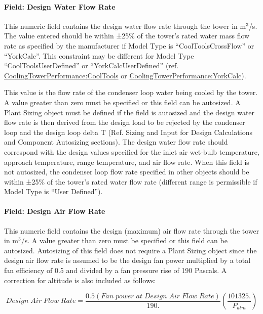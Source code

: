 \paragraph{Field: Design Water Flow Rate}\label{field-design-water-flow-rate-3}

This numeric field contains the design water flow rate through the tower in m\(^{3}\)/s. The value entered should be within ±25\% of the tower's rated water mass flow rate as specified by the manufacturer if Model Type is ``CoolToolsCrossFlow'' or ``YorkCalc''. This constraint may be different for Model Type ``CoolToolsUserDefined'' or ``YorkCalcUserDefined'' (ref. \hyperref[coolingtowerperformancecooltools]{CoolingTowerPerformance:CoolTools} or \hyperref[coolingtowerperformanceyorkcalc]{CoolingTowerPerformance:YorkCalc}).

This value is the flow rate of the condenser loop water being cooled by the tower. A value greater than zero must be specified or this field can be autosized. A Plant Sizing object must be defined if the field is autosized and the design water flow rate is then derived from the design load to be rejected by the condenser loop and the design loop delta T (Ref. Sizing and Input for Design Calculations and Component Autosizing sections). The design water flow rate should correspond with the design values specified for the inlet air wet-bulb temperature, approach temperature, range temperature, and air flow rate. When this field is not autosized, the condenser loop flow rate specified in other objects should be within ±25\% of the tower's rated water flow rate (different range is permissible if Model Type is ``User Defined'').

\paragraph{Field: Design Air Flow Rate}\label{field-design-air-flow-rate-2}

This numeric field contains the design (maximum) air flow rate through the tower in m\(^{3}\)/s. A value greater than zero must be specified or this field can be autosized. Autosizing of this field does not require a Plant Sizing object since the design air flow rate is assumed to be the design fan power multiplied by a total fan efficiency of 0.5 and divided by a fan pressure rise of 190 Pascals. A correction for altitude is also included as follows:

\begin{equation}
Design\;Air\;Flow\;Rate = \frac{{0.5(Fan\;power\;at\;Design\;Air\;Flow\;Rate)}}{{190.}}\left( {\frac{{101325.}}{{{P_{atm}}}}} \right)
\end{equation}

